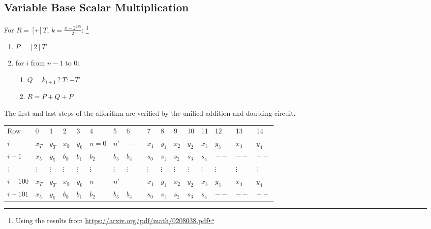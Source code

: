 \subsection{Variable Base Scalar Multiplication}
For $R  = [r]T$, $k = \frac{x - 2^{255}}{2}$:
\footnote{Using the results from \url{https://arxiv.org/pdf/math/0208038.pdf}}
\begin{enumerate}
    \item $P = [2]T$
    \item for $i$ from $n - 1$ to $0$:
    \begin{enumerate}
        \item $Q = k_{i + 1} \: ? \: T : -T$
        \item $R = P + Q + P$
    \end{enumerate}
\end{enumerate}

The first and last steps of the alforithm are verified by the unified addition and doubling circuit. 

\begin{center}
    \begin{table}[H]
        \begin{tabular}{llllllllllllllll}
            Row     & 0        & 1        & 2        & 3        & 4        & 5        & 6        & 7        & 8        & 9        & 10       & 11       & 12       & 13       & 14       \\
            $i$    & $x_T$    & $y_T$    & $x_0$    & $y_0$    & $n = 0$    & $n'$    & $--$    & $x_1$    & $y_1$    & $x_2$    & $y_2$    & $x_3$    & $y_3$ & $x_4$ & $y_4$ \\
            $i + 1$   & $x_5$    & $y_5$    & $b_0$    & $b_1$    & $b_2$    & $b_3$    & $b_4$      & $s_0$    & $s_1$    & $s_2$    & $s_3$    & $s_4$    & $--$ & $--$ & $--$ \\
            $\vdots$  & $\vdots$ & $\vdots$ & $\vdots$ & $\vdots$ & $\vdots$ & $\vdots$ & $\vdots$ & $\vdots$ & $\vdots$ & $\vdots$ & $\vdots$ & $\vdots$ & $\vdots$ & $\vdots$ & $\vdots$ \\
            $i + 100$ & $x_T$    & $y_T$    & $x_0$    & $y_0$    & $n$    & $n'$    & $--$    & $x_1$    & $y_1$    & $x_2$    & $y_2$    & $x_3$    & $y_3$ & $x_4$ & $y_4$ \\
            $i + 101$ & $x_5$    & $y_5$    & $b_0$    & $b_1$    & $b_2$    & $b_3$    & $b_4$      & $s_0$    & $s_1$    & $s_2$    & $s_3$    & $s_4$    & $--$ & $--$ & $--$ \\
        \end{tabular}
    \end{table}
\end{center}

